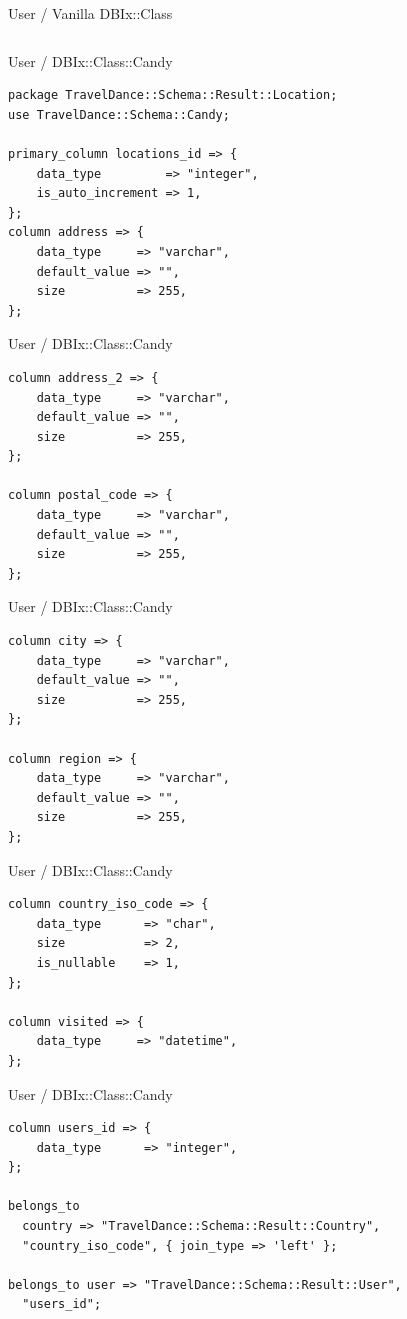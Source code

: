 \begin{frame}[fragile]{User / Vanilla DBIx::Class}
\begin{lstlisting}

\end{lstlisting}
\end{frame}

\begin{frame}[fragile]{User / DBIx::Class::Candy}
\begin{lstlisting}
package TravelDance::Schema::Result::Location;
use TravelDance::Schema::Candy;

primary_column locations_id => {
    data_type         => "integer",
    is_auto_increment => 1,
};
column address => {
    data_type     => "varchar",
    default_value => "",
    size          => 255,
};
\end{lstlisting}
\end{frame}

\begin{frame}[fragile]{User / DBIx::Class::Candy}
\begin{lstlisting}
column address_2 => {
    data_type     => "varchar",
    default_value => "",
    size          => 255,
};

column postal_code => {
    data_type     => "varchar",
    default_value => "",
    size          => 255,
};
\end{lstlisting}
\end{frame}

\begin{frame}[fragile]{User / DBIx::Class::Candy}
\begin{lstlisting}
column city => {
    data_type     => "varchar",
    default_value => "",
    size          => 255,
};

column region => {
    data_type     => "varchar",
    default_value => "",
    size          => 255,
};
\end{lstlisting}
\end{frame}

\begin{frame}[fragile]{User / DBIx::Class::Candy}
\begin{lstlisting}
column country_iso_code => {
    data_type      => "char",
    size           => 2,
    is_nullable    => 1,
};

column visited => {
    data_type     => "datetime",
};
\end{lstlisting}
\end{frame}

\begin{frame}[fragile]{User / DBIx::Class::Candy}
\begin{lstlisting}
column users_id => {
    data_type      => "integer",
};

belongs_to
  country => "TravelDance::Schema::Result::Country",
  "country_iso_code", { join_type => 'left' };

belongs_to user => "TravelDance::Schema::Result::User",
  "users_id";
\end{lstlisting}
\end{frame}


